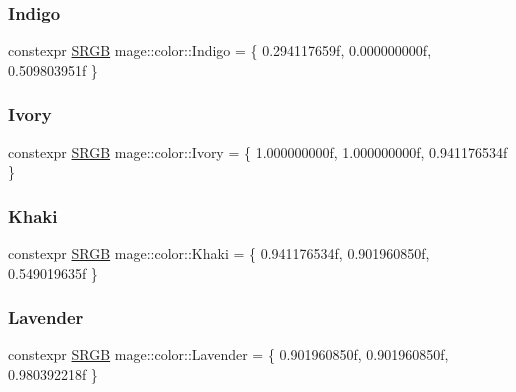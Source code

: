 \hypertarget{namespacemage_1_1color_ab31bd205544fcfb991bb62fb776bf7a6}{}\label{namespacemage_1_1color_ab31bd205544fcfb991bb62fb776bf7a6} 
\subsubsection{\texorpdfstring{Indigo}{Indigo}}
{\footnotesize\ttfamily constexpr \hyperlink{structmage_1_1_s_r_g_b}{S\+R\+GB} mage\+::color\+::\+Indigo = \{ 0.\+294117659f, 0.\+000000000f, 0.\+509803951f \}}

\hypertarget{namespacemage_1_1color_ae72c29cc5e109df4819ae907117f0452}{}\label{namespacemage_1_1color_ae72c29cc5e109df4819ae907117f0452} 
\subsubsection{\texorpdfstring{Ivory}{Ivory}}
{\footnotesize\ttfamily constexpr \hyperlink{structmage_1_1_s_r_g_b}{S\+R\+GB} mage\+::color\+::\+Ivory = \{ 1.\+000000000f, 1.\+000000000f, 0.\+941176534f \}}

\hypertarget{namespacemage_1_1color_a8fd56f3645199058ed807390858c1fb4}{}\label{namespacemage_1_1color_a8fd56f3645199058ed807390858c1fb4} 
\subsubsection{\texorpdfstring{Khaki}{Khaki}}
{\footnotesize\ttfamily constexpr \hyperlink{structmage_1_1_s_r_g_b}{S\+R\+GB} mage\+::color\+::\+Khaki = \{ 0.\+941176534f, 0.\+901960850f, 0.\+549019635f \}}

\hypertarget{namespacemage_1_1color_a5f6b29a4707a0d3f33ee6b27b5c44d73}{}\label{namespacemage_1_1color_a5f6b29a4707a0d3f33ee6b27b5c44d73} 
\subsubsection{\texorpdfstring{Lavender}{Lavender}}
{\footnotesize\ttfamily constexpr \hyperlink{structmage_1_1_s_r_g_b}{S\+R\+GB} mage\+::color\+::\+Lavender = \{ 0.\+901960850f, 0.\+901960850f, 0.\+980392218f \}}

